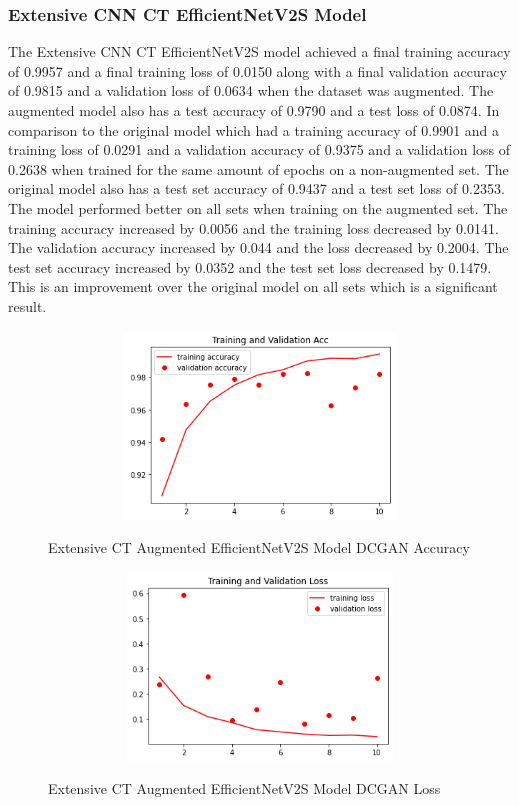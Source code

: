 \subsubsection{Extensive CNN CT EfficientNetV2S Model}
The Extensive CNN CT EfficientNetV2S model achieved a final training accuracy of 0.9957 and a final training loss of 0.0150 along with a final validation accuracy of 0.9815 and a validation loss of 0.0634  when the dataset was augmented.  The augmented model also has a test accuracy of 0.9790 and a test loss of 0.0874.  In comparison to the original model which had a training accuracy of 0.9901 and a training loss of 0.0291 and a validation accuracy of 0.9375 and a validation loss of 0.2638 when trained for the same amount of epochs on a non-augmented set.  The original model also has a test set accuracy of 0.9437 and a test set loss of 0.2353.  The model performed better on all sets when training on the augmented set.  The training accuracy increased by 0.0056 and the training loss decreased by 0.0141. The validation accuracy increased by 0.044 and the loss decreased by 0.2004.  The test set accuracy increased by 0.0352 and the test set loss decreased by 0.1479.  This is an improvement over the original model on all sets which is a significant result.

 \begin{figure}[H]
    \centering    \includegraphics[width=1\textwidth,height=5cm,keepaspectratio]{Images/EfficientNetV2STrainingValidationAccuracyExtensiveCTAugmentedDCGAN.png}\\
    \caption{Extensive CT Augmented EfficientNetV2S Model DCGAN Accuracy}
    \label{fig:Extensive CT Augmented EfficientNetV2S Model DCGAN Accuracy}
\end{figure}
 \begin{figure}[H]
    \centering
    \includegraphics[width=1\textwidth,height=5cm,keepaspectratio]{Images/EfficientNetV2SBaselineTrainingValidationLossExtensiveCT.png}\\
    \caption{Extensive CT Augmented EfficientNetV2S Model DCGAN Loss}
    \label{fig:Extensive CT Augmented EfficientNetV2S Model DCGAN Loss}
\end{figure}
